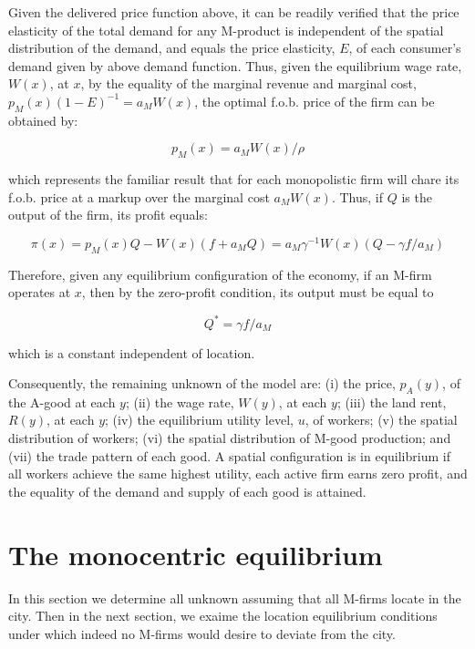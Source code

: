 Given the delivered price function above, it can be readily verified that the price elasticity of the total demand for any M-product is independent of the spatial distribution of the demand, and equals the price elasticity, $E$, of each consumer's demand given by above demand function. Thus, given the equilibrium wage rate, $W(x)$, at $x$, by the equality of the marginal revenue and marginal cost, $p_M(x) (1 - E)^{-1} = a_M W(x)$, the optimal f.o.b. price of the firm can be obtained by:

\begin{equation}
  p_M(x) = a_M W(x) / \rho
\end{equation}

which represents the familiar result that for each monopolistic firm will chare its f.o.b. price at a markup over the marginal cost $a_M W(x)$. Thus, if $Q$ is the output of the firm, its profit equals:

\begin{equation}
  \pi(x) = p_M(x) Q - W(x)(f + a_M Q) = a_M \gamma^{-1} W(x)(Q - \gamma f / a_M)
\end{equation}

Therefore, given any equilibrium configuration of the economy, if an M-firm operates at $x$, then by the zero-profit condition, its output must be equal to

\begin{equation}
  Q^* = \gamma f / a_M
\end{equation}

which is a constant independent of location.

Consequently, the remaining unknown of the model are: (i) the price, $p_A(y)$, of the A-good at each $y$; (ii) the wage rate, $W(y)$, at each $y$; (iii) the land rent, $R(y)$, at each $y$; (iv) the equilibrium utility level, $u$, of workers; (v) the spatial distribution of workers; (vi) the spatial distribution of M-good production; and (vii) the trade pattern of each good. A spatial configuration is in equilibrium if all workers achieve the same highest utility, each active firm earns zero profit, and the equality of the demand and supply of each good is attained.

\section{The monocentric equilibrium}

In this section we determine all unknown assuming that all M-firms locate in the city. Then in the next section, we exaime the location equilibrium conditions under which indeed no M-firms would desire to deviate from the city.

